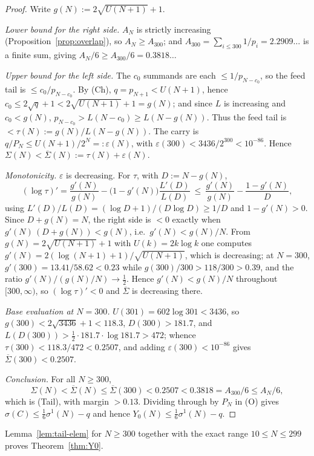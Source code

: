 \documentclass[11pt]{amsart}
\theoremstyle{plain}
\theoremstyle{definition}
\begin{document}
\begin{proof}
Write $g(N):=2\sqrt{U(N+1)}+1$.

\emph{Lower bound for the right side.}  $A_N$ is strictly increasing
(Proposition~\ref{prop:overlap}), so $A_N\ge A_{300}$; and
$A_{300}=\sum_{i\le 300}1/p_i=2.2909\ldots$ is a finite sum, giving
$A_N/6\ge A_{300}/6=0.3818\ldots$

\emph{Upper bound for the left side.}  The $c_0$ summands are each $\le1/p_{N-c_0}$,
so the feed tail is $\le c_0/p_{N-c_0}$.  By (Ch), $q=p_{N+1}<U(N+1)$, hence
$c_0\le 2\sqrt q+1<2\sqrt{U(N+1)}+1=g(N)$; and since $L$ is increasing and
$c_0<g(N)$, $p_{N-c_0}>L(N-c_0)\ge L(N-g(N))$.  Thus the feed tail is
$<\tau(N):=g(N)/L(N-g(N))$.  The carry is $q/P_N\le U(N+1)/2^N=:\varepsilon(N)$,
with $\varepsilon(300)<3436/2^{300}<10^{-86}$.  Hence
$\Sigma(N)<\overline\Sigma(N):=\tau(N)+\varepsilon(N)$.

\emph{Monotonicity.}  $\varepsilon$ is decreasing.  For $\tau$, with $D:=N-g(N)$,
\[
  (\log\tau)'=\frac{g'(N)}{g(N)}-\bigl(1-g'(N)\bigr)\frac{L'(D)}{L(D)}
  \ \le\ \frac{g'(N)}{g(N)}-\frac{1-g'(N)}{D},
\]
using $L'(D)/L(D)=(\log D+1)/(D\log D)\ge 1/D$ and $1-g'(N)>0$.  Since $D+g(N)=N$,
the right side is $<0$ exactly when $g'(N)\,(D+g(N))<g(N)$, i.e.\ $g'(N)<g(N)/N$.
From $g(N)=2\sqrt{U(N+1)}+1$ with $U(k)=2k\log k$ one computes
$g'(N)=2(\log(N+1)+1)/\sqrt{U(N+1)}$, which is decreasing; at $N=300$,
$g'(300)=13.41/58.62<0.23$ while $g(300)/300>118/300>0.39$, and the ratio
$g'(N)/(g(N)/N)\to\tfrac12$.  Hence $g'(N)<g(N)/N$ throughout $[300,\infty)$, so
$(\log\tau)'<0$ and $\overline\Sigma$ is decreasing there.

\emph{Base evaluation at $N=300$.}  $U(301)=602\log 301<3436$, so
$g(300)<2\sqrt{3436}+1<118.3$, $D(300)>181.7$, and
$L(D(300))>\tfrac12\cdot181.7\cdot\log 181.7>472$; whence
$\tau(300)<118.3/472<0.2507$, and adding $\varepsilon(300)<10^{-86}$ gives
$\overline\Sigma(300)<0.2507$.

\emph{Conclusion.}  For all $N\ge300$,
\[
  \Sigma(N)<\overline\Sigma(N)\le\overline\Sigma(300)<0.2507<0.3818
  =A_{300}/6\le A_N/6,
\]
which is (Tail), with margin $>0.13$.  Dividing through by $P_N$ in (O) gives
$\sigma(C)\le\tfrac16\sigma^1(N)-q$ and hence $Y_0(N)\le\tfrac16\sigma^1(N)-q$.
\end{proof}

\noindent
Lemma~\ref{lem:tail-elem} for $N\ge300$ together with the exact range
$10\le N\le 299$ proves Theorem~\ref{thm:Y0}.
\end{document}
